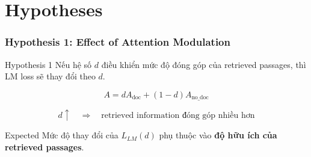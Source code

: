 
\section{Hypotheses}


\begin{frame}
    \frametitle{Hypothesis 1: Effect of Attention Modulation}

    \small

    \begin{block}{Hypothesis 1}
        Nếu hệ số $d$ điều khiển mức độ đóng góp của retrieved
        passages, thì LM loss sẽ thay đổi theo $d$.
    \end{block}

    \vspace{0.3cm}

    \begin{center}
    \[
        A =
        dA_{\mathrm{doc}}
        +
        (1-d)A_{\mathrm{no\_doc}}
    \]

    \vspace{0.15cm}

    \[
        d \uparrow
        \quad\Longrightarrow\quad
        \text{retrieved information đóng góp nhiều hơn}
    \]
    \end{center}

    \vspace{0.25cm}

    \begin{block}{Expected}
        \centering
        Mức độ thay đổi của $L_{LM}(d)$ phụ thuộc vào
        \textbf{độ hữu ích của retrieved passages}.
    \end{block}

\end{frame}



